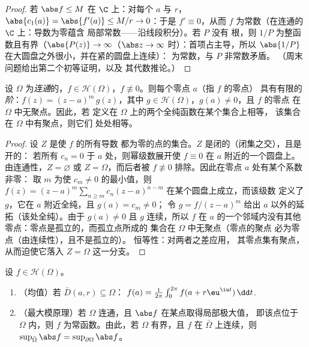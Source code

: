 \begin{proof}
若 $\abs f \leq M$ 在 $\C$ 上：对每个 $a$ 与 $r$，$\abs{c_1(a)}
= \abs{f'(a)} \leq M/r \to 0$：于是 $f' \equiv 0$，从而 $f$
为常数（在连通的 $\C$ 上：导数为零蕴含
局部常数——沿线段积分）。若 $P$ 没有
根，则 $1/P$ 为整函数且有界（$\abs{P(z)} \to
\infty$（$\abs z \to \infty$ 时）：首项占主导，所以
$\abs{1/P}$ 在大圆盘之外很小，并在紧的圆盘上连续）：
为常数，与 $P$ 非常数矛盾。
（周末问题给出第二个初等证明，以及
其代数推论。）
\end{proof}

\begin{theorem}
\label{thm:b3:holomorphic:identity}
设 $\Omega$ 为\emph{连通}的，$f \in \mathcal
H(\Omega)$，$f \not\equiv 0$。则每个零点 $a$（指 $f$ 的零点）
具有有限的\emph{阶}：$f(z) = (z - a)^m\,g(z)$，其中 $g \in
\mathcal H(\Omega)$，$g(a) \neq 0$，且 $f$ 的零点
在 $\Omega$ 中无聚点。因此，若
定义在 $\Omega$ 上的两个全纯函数在某个集合上相等，
该集合在 $\Omega$ 中有聚点，则它们
处处相等。
\end{theorem}

\begin{proof}
设 $Z$ 是使 $f$ 的所有导数
都为零的点的集合。$Z$ 是闭的（闭集之交），且是开的：
若所有 $c_n = 0$ 于 $a$ 处，则幂级数展开使 $f
\equiv 0$ 在 $a$ 附近的一个圆盘上。由连通性，$Z =
\varnothing$ 或 $Z = \Omega$，而后者被 $f
\not\equiv 0$ 排除。因此在零点 $a$ 处有某个系数非零：
取 $m$ 为使 $c_m \neq 0$ 的最小值，则 $f(z) = (z -
a)^m\sum_{n\geq m}c_n(z-a)^{n-m}$ 在某个圆盘上成立，而该级数
定义了 $g$，它在 $a$ 附近全纯，且 $g(a) = c_m \neq 0$；
令 $g = f/(z-a)^m$ 给出 $a$ 以外的延拓（该处全纯）。由于
$g(a) \neq 0$ 且 $g$ 连续，所以 $f$ 在
$a$ 的一个邻域内没有其他零点：零点是孤立的，而孤立点所成的
集合在 $\Omega$ 中无聚点（零点的聚点
必为零点（由连续性），且不是孤立的）。
恒等性：对两者之差应用，
其零点集有聚点，从而迫使它落入
$Z = \Omega$ 这一分支。
\end{proof}

\begin{theorem}[均值与最大模]
\label{thm:b3:holomorphic:maximum}
设 $f \in \mathcal H(\Omega)$。
\begin{enumerate}
  \item （均值）若 $\bar D(a, r) \subseteq \Omega$：
        $f(a) = \frac1{2\pi}\int_0^{2\pi}f(a +
        r\eu^{\iu t})\,\dd t$.
  \item （最大模原理）若 $\Omega$ 连通，且
        $\abs f$ 在某点取得局部极大值，
        即该点位于 $\Omega$ 内，则 $f$ 为常函数。由此，若
        $\Omega$ 有界，且 $f$ 在
        $\bar\Omega$ 上连续，则 $\sup_{\bar\Omega}\abs f =
        \sup_{\partial\Omega}\abs f$。
\end{enumerate}
\end{theorem}

